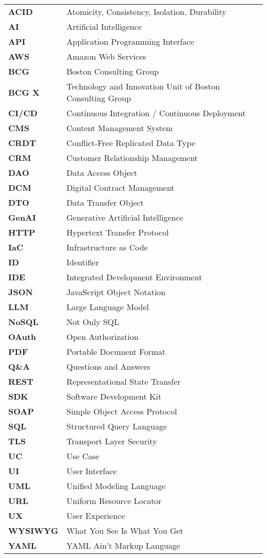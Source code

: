 \begin{longtable}{l l}
    \textbf{ACID} & Atomicity, Consistency, Isolation, Durability \\
    \textbf{AI} & Artificial Intelligence \\
    \textbf{API} & Application Programming Interface \\
    \textbf{AWS} & Amazon Web Services \\
    \textbf{BCG} & Boston Consulting Group \\
    \textbf{BCG X} & Technology and Innovation Unit of Boston Consulting Group \\
    \textbf{CI/CD} & Continuous Integration / Continuous Deployment \\
    \textbf{CMS} & Content Management System \\
    \textbf{CRDT} & Conflict-Free Replicated Data Type \\
    \textbf{CRM} & Customer Relationship Management \\
    \textbf{DAO} & Data Access Object \\
    \textbf{DCM} & Digital Contract Management \\
    \textbf{DTO} & Data Transfer Object \\
    \textbf{GenAI} & Generative Artificial Intelligence \\
    \textbf{HTTP} & Hypertext Transfer Protocol \\
    \textbf{IaC} & Infrastructure as Code \\
    \textbf{ID} & Identifier \\
    \textbf{IDE} & Integrated Development Environment \\
    \textbf{JSON} & JavaScript Object Notation \\
    \textbf{LLM} & Large Language Model \\
    \textbf{NoSQL} & Not Only SQL \\
    \textbf{OAuth} & Open Authorization \\
    \textbf{PDF} & Portable Document Format \\
    \textbf{Q\&A} & Questions and Answers \\
    \textbf{REST} & Representational State Transfer \\
    \textbf{SDK} & Software Development Kit \\
    \textbf{SOAP} & Simple Object Access Protocol \\
    \textbf{SQL} & Structured Query Language \\
    \textbf{TLS} & Transport Layer Security \\
    \textbf{UC} & Use Case \\
    \textbf{UI} & User Interface \\
    \textbf{UML} & Unified Modeling Language \\
    \textbf{URL} & Uniform Resource Locator \\
    \textbf{UX} & User Experience \\
    \textbf{WYSIWYG} & What You See Is What You Get \\
    \textbf{YAML} & YAML Ain't Markup Language \\
\end{longtable}
